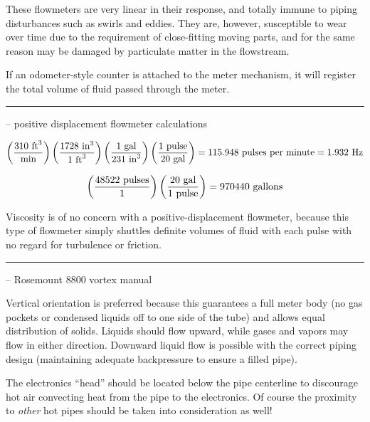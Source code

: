 \vskip 10pt

These flowmeters are very linear in their response, and totally immune to piping disturbances such as swirls and eddies.  They are, however, susceptible to wear over time due to the requirement of close-fitting moving parts, and for the same reason may be damaged by particulate matter in the flowstream.

\vskip 10pt

If an odometer-style counter is attached to the meter mechanism, it will register the total volume of fluid passed through the meter.


\filbreak \vskip 5pt \hrule \vskip 5pt  -- positive displacement flowmeter calculations \vskip 10pt

$$\left( {310 \hbox{ ft}^3 \over \hbox{min}} \right)  \left( {1728 \hbox{ in}^3 \over 1 \hbox{ ft}^3} \right)  \left({1 \hbox{ gal} \over 231 \hbox{ in}^3}\right)   \left( {1 \hbox{ pulse} \over 20 \hbox{ gal}} \right) = 115.948 \hbox{ pulses per minute} = 1.932 \hbox{ Hz}$$

\vskip 10pt

$$\left({48522 \hbox{ pulses}\over 1}\right) \left({20 \hbox{ gal} \over 1 \hbox{ pulse}}\right) = 970440 \hbox{ gallons}$$

\vskip 10pt

Viscosity is of no concern with a positive-displacement flowmeter, because this type of flowmeter simply shuttles definite volumes of fluid with each pulse with no regard for turbulence or friction.


\filbreak \vskip 5pt \hrule \vskip 5pt  -- Rosemount 8800 vortex manual \vskip 10pt

Vertical orientation is preferred because this guarantees a full meter body (no gas pockets or condensed liquids off to one side of the tube) and allows equal distribution of solids.  Liquids should flow upward, while gases and vapors may flow in either direction.  Downward liquid flow is possible with the correct piping design (maintaining adequate backpressure to ensure a filled pipe).

\vskip 10pt

The electronics ``head'' should be located below the pipe centerline to discourage hot air convecting heat from the pipe to the electronics.  Of course the proximity to {\it other} hot pipes should be taken into consideration as well!

